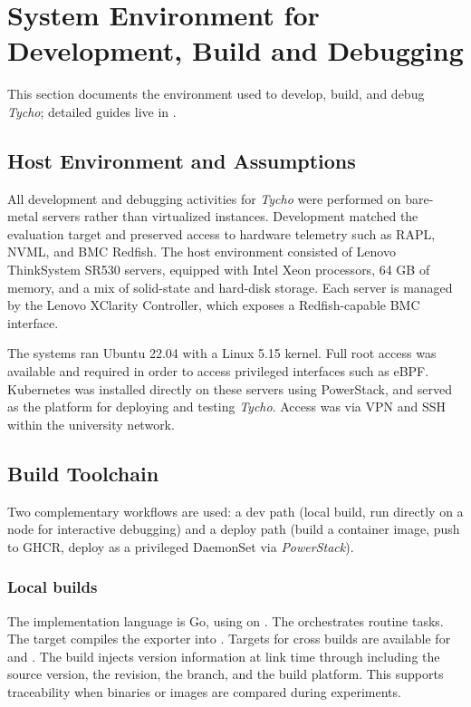 \section{System Environment for Development, Build and Debugging}
\label{sec:tycho_sysenv}
This section documents the environment used to develop, build, and debug \textit{Tycho}; detailed guides live in \cite{TychoRepo}.

\subsection{Host Environment and Assumptions}
\label{sec:tycho_sysenv_host}

All development and debugging activities for \textit{Tycho} were performed on bare-metal servers rather than virtualized instances. Development matched the evaluation target and preserved access to hardware telemetry such as RAPL, NVML, and BMC Redfish. The host environment consisted of Lenovo ThinkSystem SR530 servers, equipped with Intel Xeon processors, 64 GB of memory, and a mix of solid-state and hard-disk storage. Each server is managed by the Lenovo XClarity Controller, which exposes a Redfish-capable BMC interface.

The systems ran Ubuntu 22.04 with a Linux 5.15 kernel. Full root access was available and required in order to access privileged interfaces such as eBPF. Kubernetes was installed directly on these servers using PowerStack\cite{PowerStack}, and served as the platform for deploying and testing \textit{Tycho}. Access was via VPN and SSH within the university network.

\subsection{Build Toolchain}
\label{sec:tycho_sysenv_build}

Two complementary workflows are used: a dev path (local build, run directly on a node for interactive debugging) and a deploy path (build a container image, push to GHCR, deploy as a privileged DaemonSet via \textit{PowerStack}).

\subsubsection{Local builds}
\label{subsec:tycho_sysenv_build_local}
The implementation language is Go, using  on . The  orchestrates routine tasks. The target  compiles the exporter into . Targets for cross builds are available for  and . The build injects version information at link time through  including the source version, the revision, the branch, and the build platform. This supports traceability when binaries or images are compared during experiments.

